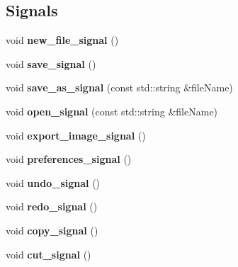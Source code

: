 \subsection*{Signals}
\begin{DoxyCompactItemize}
\item 
\hypertarget{classBixelWindow_a0ca7305900c3368348c36dbd73a51af9}{void {\bfseries new\-\_\-file\-\_\-signal} ()}\label{classBixelWindow_a0ca7305900c3368348c36dbd73a51af9}

\item 
\hypertarget{classBixelWindow_ac3542a30d554c494749f81c4928e4691}{void {\bfseries save\-\_\-signal} ()}\label{classBixelWindow_ac3542a30d554c494749f81c4928e4691}

\item 
\hypertarget{classBixelWindow_a184916c5970b4189571c61a40bcddb81}{void {\bfseries save\-\_\-as\-\_\-signal} (const std\-::string \&file\-Name)}\label{classBixelWindow_a184916c5970b4189571c61a40bcddb81}

\item 
\hypertarget{classBixelWindow_a1f5cdec267152e7c84fa3430c4cea442}{void {\bfseries open\-\_\-signal} (const std\-::string \&file\-Name)}\label{classBixelWindow_a1f5cdec267152e7c84fa3430c4cea442}

\item 
\hypertarget{classBixelWindow_ac2902048d0627c28fd38102434e6baa0}{void {\bfseries export\-\_\-image\-\_\-signal} ()}\label{classBixelWindow_ac2902048d0627c28fd38102434e6baa0}

\item 
\hypertarget{classBixelWindow_af52996e623d4b53b5dc905c931960dc1}{void {\bfseries preferences\-\_\-signal} ()}\label{classBixelWindow_af52996e623d4b53b5dc905c931960dc1}

\item 
\hypertarget{classBixelWindow_a94c52d6d03787661d8cb142657cfebbd}{void {\bfseries undo\-\_\-signal} ()}\label{classBixelWindow_a94c52d6d03787661d8cb142657cfebbd}

\item 
\hypertarget{classBixelWindow_aaec5ff0c79673adf41f9d11acf8d696d}{void {\bfseries redo\-\_\-signal} ()}\label{classBixelWindow_aaec5ff0c79673adf41f9d11acf8d696d}

\item 
\hypertarget{classBixelWindow_a752d221cb9e200ee23a3ad0cf20fd8b8}{void {\bfseries copy\-\_\-signal} ()}\label{classBixelWindow_a752d221cb9e200ee23a3ad0cf20fd8b8}

\item 
\hypertarget{classBixelWindow_a1fe8ae25f04273997c5b23bbb161af4e}{void {\bfseries cut\-\_\-signal} ()}\label{classBixelWindow_a1fe8ae25f04273997c5b23bbb161af4e}


\end{DoxyCompactItemize}
